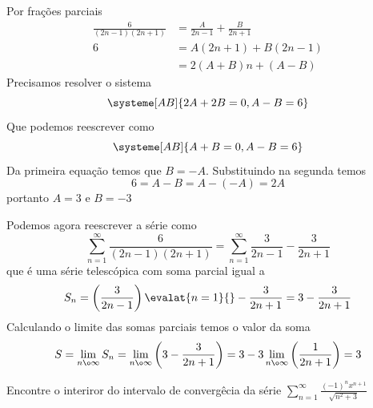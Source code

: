 \documentclass[a4paper,12pt,fleqn]{article}
\begin{document}
\begin{answer}
  Por frações parciais
  \begin{align*}
    \frac{6}{(2n-1)(2n+1)} & = \frac{A}{2n-1} + \frac{B}{2n+1} \\[2mm]
    6 & = A(2n+1) + B (2n-1) \\[2mm]
      & = 2(A+B)n + (A-B)
  \end{align*}
  Precisamos resolver o sistema
  \[\systeme[AB]{
    2A + 2B = 0,
    A - B = 6
  }\]
  Que podemos reescrever como
  \[\systeme[AB]{
    A + B = 0,
    A - B = 6
  }\]
  Da primeira equação temos que $B=-A$. Substituindo na segunda temos
  \[
    6 = A - B = A - (-A) = 2A
  \]
  portanto \(A=3\) e \(B=-3\)

  Podemos agora reescrever a série como
  \[
    \sum_{n=1}^{\infty} \frac{6}{(2n-1)(2n+1)}
    = \sum_{n=1}^{\infty} \frac{3}{2n-1} - \frac{3}{2n+1}
  \]
  que é uma série telescópica com soma parcial igual a
  \[
    S_n
    = \left(\frac{3}{2n-1}\right)\evalat{n=1}{}  - \frac{3}{2n+1}
    = 3 - \frac{3}{2n+1}
  \]
  Calculando o limite das somas parciais temos o valor da soma
  \[
    S
    = \lim_{n\o\infty} S_n
    = \lim_{n\o\infty} \left(3 - \frac{3}{2n+1}\right)
    = 3 - 3\lim_{n\o\infty} \left(\frac{1}{2n+1}\right)
    = 3
  \]
  \clearpage
\end{answer}

Encontre o interiror do intervalo de convergêcia da série
\(
  \sum_{n=1}^\infty \frac{(-1)^n x^{n+1}}{\sqrt{n^2 + 3}}
\)
\end{document}
